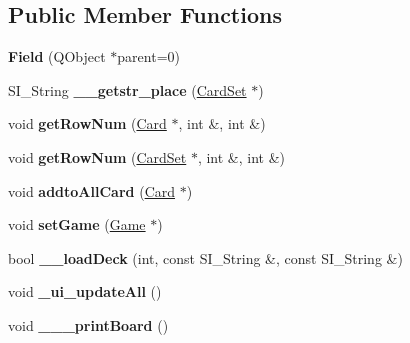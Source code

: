 \subsection*{Public Member Functions}
\begin{DoxyCompactItemize}
\item 
\mbox{\label{class_field_ae52ac347bd3fc1298fe0682c215cc950}} 
{\bfseries Field} (Q\+Object $\ast$parent=0)
\item 
\mbox{\label{class_field_a45b07177d91e5c8e43cc9506a0fc3ee7}} 
S\+I\+\_\+\+String {\bfseries \+\_\+\+\_\+getstr\+\_\+place} (\hyperlink{class_card_set}{Card\+Set} $\ast$)
\item 
\mbox{\label{class_field_a60541c561e9b2298b120a4734336c3f8}} 
void {\bfseries get\+Row\+Num} (\hyperlink{class_card}{Card} $\ast$, int \&, int \&)
\item 
\mbox{\label{class_field_ac44aee7eeb56a276953e00e92364c7ba}} 
void {\bfseries get\+Row\+Num} (\hyperlink{class_card_set}{Card\+Set} $\ast$, int \&, int \&)
\item 
\mbox{\label{class_field_ad73cca756ca943cf7e40a2b54735deab}} 
void {\bfseries addto\+All\+Card} (\hyperlink{class_card}{Card} $\ast$)
\item 
\mbox{\label{class_field_a02bd7bb54ea117328f07909877a20f37}} 
void {\bfseries set\+Game} (\hyperlink{class_game}{Game} $\ast$)
\item 
\mbox{\label{class_field_a63d3baf4b4566fce6421284bb8053ebb}} 
bool {\bfseries \+\_\+\+\_\+load\+Deck} (int, const S\+I\+\_\+\+String \&, const S\+I\+\_\+\+String \&)
\item 
\mbox{\label{class_field_a92518b020b06e8beed9c778fd0cd5d4c}} 
void {\bfseries \+\_\+ui\+\_\+update\+All} ()
\item 
\mbox{\label{class_field_ac09e33b27d97234f8d46e27874649bea}} 
void {\bfseries \+\_\+\+\_\+\+\_\+print\+Board} ()
\end{DoxyCompactItemize}
